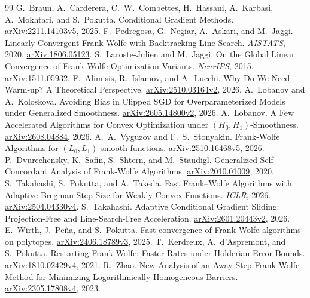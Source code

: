 \begin{thebibliography}{99}
 G.~Braun, A.~Carderera, C.~W.~Combettes, H.~Hassani,
A.~Karbasi, A.~Mokhtari, and S.~Pokutta. Conditional Gradient Methods.
\href{https://arxiv.org/abs/2211.14103v5}{arXiv:2211.14103v5}, 2025.
 F.~Pedregosa, G.~Negiar, A.~Askari, and M.~Jaggi.
Linearly Convergent Frank-Wolfe with Backtracking Line-Search.
\emph{AISTATS}, 2020. \href{https://arxiv.org/abs/1806.05123}{arXiv:1806.05123}.
 S.~Lacoste-Julien and M.~Jaggi.
On the Global Linear Convergence of Frank-Wolfe Optimization Variants.
\emph{NeurIPS}, 2015.
\href{https://arxiv.org/abs/1511.05932}{arXiv:1511.05932}.
 F.~Alimisis, R.~Islamov, and A.~Lucchi.
Why Do We Need Warm-up? A Theoretical Perspective.
\href{https://arxiv.org/abs/2510.03164v2}{arXiv:2510.03164v2}, 2026.
 A.~Lobanov and A.~Koloskova.
Avoiding Bias in Clipped SGD for Overparameterized Models under Generalized Smoothness.
\href{https://arxiv.org/abs/2605.14800v2}{arXiv:2605.14800v2}, 2026.
 A.~Lobanov.
A Few Accelerated Algorithms for Convex Optimization under $(H_0,H_1)$-Smoothness.
\href{https://arxiv.org/abs/2608.04884}{arXiv:2608.04884}, 2026.
 A.~A.~Vyguzov and F.~S.~Stonyakin.
Frank-Wolfe Algorithms for $(L_0,L_1)$-smooth functions.
\href{https://arxiv.org/abs/2510.16468v5}{arXiv:2510.16468v5}, 2026.
 P.~Dvurechensky, K.~Safin, S.~Shtern, and M.~Staudigl.
Generalized Self-Concordant Analysis of Frank-Wolfe Algorithms.
\href{https://arxiv.org/abs/2010.01009}{arXiv:2010.01009}, 2020.
 S.~Takahashi, S.~Pokutta, and A.~Takeda.
Fast Frank--Wolfe Algorithms with Adaptive Bregman Step-Size for Weakly Convex Functions.
\emph{ICLR}, 2026.
\href{https://arxiv.org/abs/2504.04330v4}{arXiv:2504.04330v4}.
 S.~Takahashi.
Adaptive Conditional Gradient Sliding: Projection-Free and Line-Search-Free Acceleration.
\href{https://arxiv.org/abs/2601.20443v2}{arXiv:2601.20443v2}, 2026.
 E.~Wirth, J.~Pe\~na, and S.~Pokutta.
Fast convergence of Frank-Wolfe algorithms on polytopes.
\href{https://arxiv.org/abs/2406.18789v3}{arXiv:2406.18789v3}, 2025.
 T.~Kerdreux, A.~d'Aspremont, and S.~Pokutta.
Restarting Frank-Wolfe: Faster Rates under H\"olderian Error Bounds.
\href{https://arxiv.org/abs/1810.02429v4}{arXiv:1810.02429v4}, 2021.
 R.~Zhao.
New Analysis of an Away-Step Frank-Wolfe Method for Minimizing
Logarithmically-Homogeneous Barriers.
\href{https://arxiv.org/html/2305.17808v4}{arXiv:2305.17808v4}, 2023.

\end{thebibliography}
